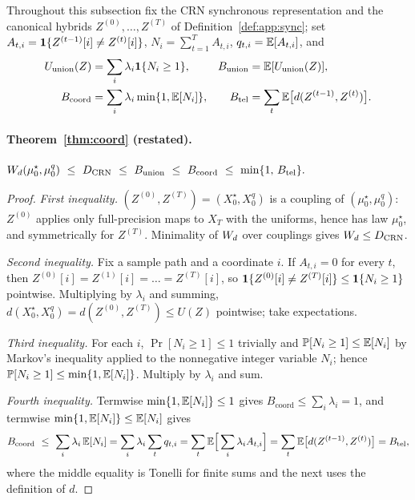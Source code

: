 Throughout this subsection fix the CRN synchronous representation and the canonical hybrids
$Z^{(0)},\dots,Z^{(T)}$ of Definition~\ref{def:app:sync}; set
$A_{t,i}=\mathbf{1}\{Z^{(t-1)}[i]\neq Z^{(t)}[i]\}$, $N_{i}=\sum_{t=1}^{T}A_{t,i}$,
$q_{t,i}=\mathbb{E}[A_{t,i}]$, and
\begin{align*}
U_{\mathrm{union}}(Z)&=\sum_i\lambda_i\mathbf{1}\{N_i\ge1\},
& B_{\mathrm{union}}&=\mathbb{E}[U_{\mathrm{union}}(Z)],\\
B_{\mathrm{coord}}&=\sum_i\lambda_i\min\{1,\mathbb{E}[N_i]\},
& B_{\mathrm{tel}}&=\sum_t\mathbb{E}\big[d(Z^{(t-1)},Z^{(t)})\big].
\end{align*}

\paragraph{Theorem~\ref{thm:coord} (restated).}
$\displaystyle
\Wd(\mu^{\star}_{0},\mu^{q}_{0})\ \le\ \Dcrn\ \le\ B_{\mathrm{union}}\ \le\ B_{\mathrm{coord}}
\ \le\ \min\{1,\,B_{\mathrm{tel}}\}.$

\begin{proof}
\emph{First inequality.} $(Z^{(0)},Z^{(T)})=(X^{\star}_{0},X^{q}_{0})$ is a coupling of
$(\mu^{\star}_{0},\mu^{q}_{0})$: $Z^{(0)}$ applies only full-precision maps to $X_{T}$ with the
uniforms, hence has law $\mu^{\star}_{0}$, and symmetrically for $Z^{(T)}$. Minimality of $W_{d}$
over couplings gives $W_{d}\le D_{\mathrm{CRN}}$.

\emph{Second inequality.} Fix a sample path and a coordinate $i$. If $A_{t,i}=0$ for every $t$,
then $Z^{(0)}[i]=Z^{(1)}[i]=\dots=Z^{(T)}[i]$, so
$\mathbf{1}\{Z^{(0)}[i]\neq Z^{(T)}[i]\}\le\mathbf{1}\{N_{i}\ge1\}$ pointwise. Multiplying by $\lambda_{i}$ and
summing,
$d(X^{\star}_{0},X^{q}_{0})=d(Z^{(0)},Z^{(T)})\le U(Z)$ pointwise; take expectations.

\emph{Third inequality.} For each $i$, $\Pr[N_{i}\ge1]\le1$ trivially and
$\mathbb{P}[N_{i}\ge1]\le\mathbb{E}[N_{i}]$ by Markov's inequality applied to the nonnegative integer variable
$N_{i}$; hence $\mathbb{P}[N_{i}\ge1]\le\min\{1,\mathbb{E}[N_{i}]\}$. Multiply by $\lambda_{i}$ and sum.

\emph{Fourth inequality.} Termwise $\min\{1,\mathbb{E}[N_{i}]\}\le1$ gives
$B_{\mathrm{coord}}\le\sum_{i}\lambda_{i}=1$, and termwise
$\min\{1,\mathbb{E}[N_{i}]\}\le\mathbb{E}[N_{i}]$ gives
\[
B_{\mathrm{coord}}\ \le\ \sum_{i}\lambda_{i}\,\Ex[N_{i}]
=\sum_{i}\lambda_{i}\sum_{t}q_{t,i}
=\sum_{t}\Ex\Big[\sum_{i}\lambda_{i}A_{t,i}\Big]
=\sum_{t}\Ex\big[d(Z^{(t-1)},Z^{(t)})\big]=B_{\mathrm{tel}},
\]
where the middle equality is Tonelli for finite sums and the next uses the definition of $d$.
\end{proof}

